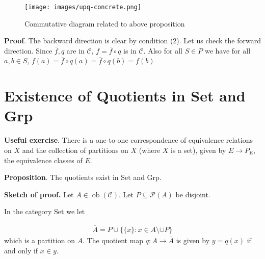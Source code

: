 \documentclass{memoir}
\begin{document}
\begin{figure}
\centering
\texttt{[image: images/upq-concrete.png]}
\caption{Commutative diagram related to above proposition}
\end{figure}


\textbf{Proof}. The backward direction is clear by condition (2). Let us check the forward direction. Since \(\overline{f}, q\) are in \(\mathcal{C}\), \(f = \overline{f} \circ q\) is in \(\mathcal{C}\). Also for all \(S \in P\) we have for all \(a,b \in S\), \(f(a) = \overline{f} \circ q(a) = \overline{f} \circ q(b) = f(b)\)

\chapter{Existence of Quotients in Set and Grp}

\textbf{Useful exercise}. There is a one-to-one correspondence of equivalence relations on \(X\) and the collection of partitions on \(X\) (where \(X\) is a set), given by \(E \to P_{E}\), the equivalence classes of \(E\).

\textbf{Proposition}. The quotients exist in \(\mathrm{Set}\) and \(\mathrm{Grp}\).

\textbf{Sketch of proof.} Let \(A \in \operatorname{ob}(\mathcal{C})\). Let \(P \subseteq \mathcal{P}(A)\) be disjoint.

In the category \(\mathrm{Set}\) we let

\begin{equation*}
\begin{split}\overline{A} = P \cup \{\{x\} : x \in A \setminus \cup P\}\end{split}\end{equation*}
which is a partition on \(A\). The quotient map \(q : A \to \overline{A}\) is given by \(y = q(x)\) if and only if \(x \in y\).
\end{document}

